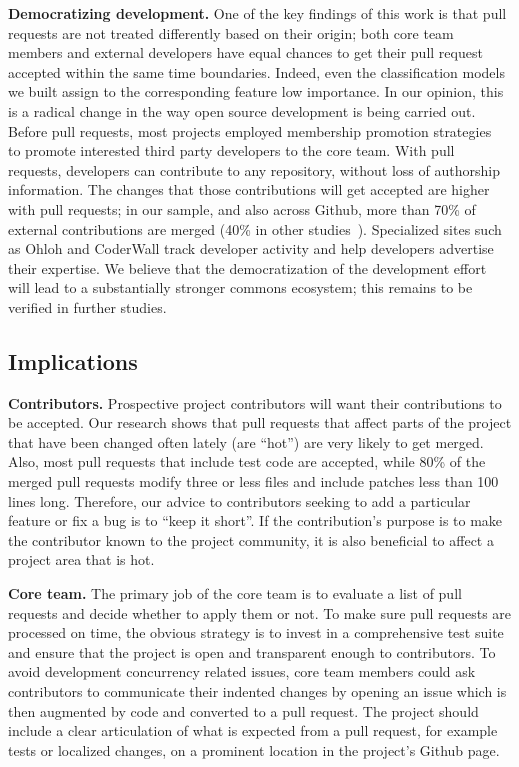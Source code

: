 \documentclass{sig-alternate}
\begin{document}
%
\textbf{Democratizing development.} One of the key findings of this work is
that pull requests are not treated differently based on their origin; both core
team members and external developers have equal chances to get their pull
request accepted within the same time boundaries. Indeed, even the
classification models we built assign to the corresponding feature low
importance. In our opinion, this is a radical change in the way open source
development is being carried out. Before pull requests, most projects employed
membership promotion strategies~\cite{Jense07} to promote interested third party
developers to the core team. With pull requests, developers can contribute to
any repository, without loss of authorship information. The changes that those
contributions will get accepted are higher with pull requests; in our sample,
and also across Github, more than 70\% of external contributions are merged
(40\% in other studies~\cite{Rigby06, Weiss08}). Specialized sites such as
Ohloh and CoderWall track developer activity and help developers advertise their
expertise. We believe that the democratization of the development effort will
lead to a substantially stronger commons ecosystem; this remains to be
verified in further studies.


\subsection{Implications}

\textbf{Contributors.} Prospective project contributors will want their
contributions to be accepted. Our research shows that pull requests that affect
parts of the project that  have been changed often lately (are ``hot'') are very
likely to get merged. Also, most pull requests that include test code are
accepted, while 80\% of the merged pull requests modify three or less files and
include patches less than 100 lines long. Therefore, our advice to contributors
seeking to add a particular feature or fix a bug is to ``keep it short''. If the
contribution's purpose is to make the contributor known to the project
community, it is also beneficial to affect a project area that is hot.

\textbf{Core team.} The primary job of the core team is to evaluate a list of
pull requests and decide whether to apply them or not. To make sure pull
requests are processed on time, the obvious strategy is to invest in a
comprehensive test suite and ensure that the project is open and transparent
enough to contributors. To avoid development concurrency related issues, core
team members could ask contributors to communicate their indented changes by
opening an issue which is then augmented by code and converted to a pull
request. The project should include a clear articulation of what is expected
from a pull request, for example tests or localized changes, on a prominent
location in the project's Github page.
\end{document}
